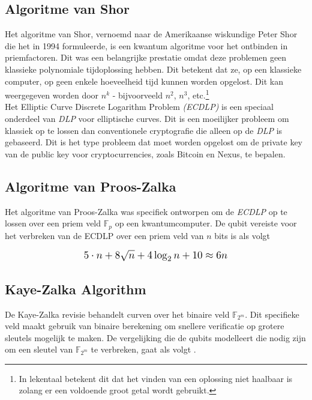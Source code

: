 \documentclass[11pt]{article}
\begin{document}
\subsection{Algoritme van Shor}

\noindent Het algoritme van Shor, vernoemd naar de Amerikaanse wiskundige Peter Shor die het in 1994 formuleerde, is een kwantum algoritme \cite{shorarxiv} voor het ontbinden in priemfactoren.
Dit was een belangrijke prestatie omdat deze problemen geen klassieke polynomiale tijdoplossing hebben.
Dit betekent dat ze, op een klassieke computer, op geen enkele  hoeveelheid tijd kunnen worden opgelost. Dit kan weergegeven worden door $n^k$ - bijvoorveeld $n^2$, $n^3$, etc.\footnote{In lekentaal betekent dit dat het vinden van een oplossing niet haalbaar is zolang er een voldoende groot getal wordt gebruikt.}\\ 

\noindent Het Elliptic Curve Discrete Logarithm Problem \textit{(ECDLP)} is een speciaal onderdeel van \textit{DLP} voor elliptische curves.
Dit is een moeilijker probleem om klassiek op te lossen dan conventionele cryptografie die alleen op de \textit{DLP} is gebaseerd.\cite{prooszalka} %
Dit is het type probleem dat moet worden opgelost om de private key van de public key voor cryptocurrencies, zoals Bitcoin en Nexus, te bepalen.\\

\subsection{Algoritme van Proos-Zalka}

Het algoritme van Proos-Zalka was specifiek ontworpen om de \textit{ECDLP} op te lossen over een priem veld $\mathbb{F}_p$ op een kwantumcomputer.
De qubit vereiste voor het verbreken van de ECDLP over een priem veld van $n$ bits is als volgt \cite{prooszalka}

\begin{equation}
\resizebox{.5\hsize}{!}{$5\cdot n + 8 \sqrt{n} + 4 \log_{2} n + 10 \approx 6n$}
\end{equation}

\subsection{Kaye-Zalka Algorithm}
De Kaye-Zalka revisie behandelt curven over het binaire veld $\mathbb{F}_{2^m}$. Dit specifieke veld maakt gebruik van binaire berekening om snellere verificatie op grotere sleutels mogelijk te maken. De vergelijking die de qubits modelleert die nodig zijn om een sleutel van $\mathbb{F}_{2^m}$ te verbreken, gaat als volgt \cite{kayezalka}.
\end{document}

